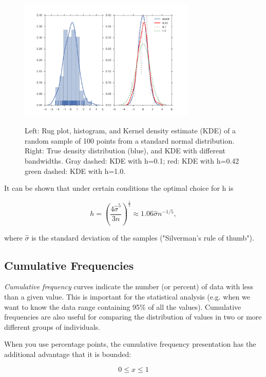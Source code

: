 \begin{figure}[ht]
  \centering
  \includegraphics[width=0.75\textwidth]{../Images/KDEplot.png}\\
  \caption{ Left: Rug plot, histogram, and Kernel density estimate (KDE) of a random sample of 100 points from a standard normal distribution. Right: True density distribution (blue), and KDE with different bandwidths. Gray dashed: KDE with h=0.1; red: KDE with h=0.42 green dashed: KDE with h=1.0.}
  \label{fig:kdeBandwidth}
\end{figure}

It can be shown that under certain conditions the optimal choice for h is

\begin{equation}
  h = \left(\frac{4\hat{\sigma}^5}{3n}\right)^{\frac{1}{5}} \approx 1.06 \hat{\sigma} n^{-1/5},
\end{equation}

where $\hat{\sigma}$ is the standard deviation of the samples ("Silverman's rule of thumb").

\subsection{Cumulative Frequencies}

\emph{Cumulative frequency} curves indicate the number (or percent) of data with less than a given value. This is important for the statistical analysis (e.g. when we want to know the data range containing 95\% of all the values). Cumulative frequencies
are also useful for comparing the distribution of values in two or more different groups of individuals.

When you use percentage points, the cumulative frequency presentation has the additional advantage that it is bounded:

\begin{equation*}
  0 \leq x \leq 1
\end{equation*}

